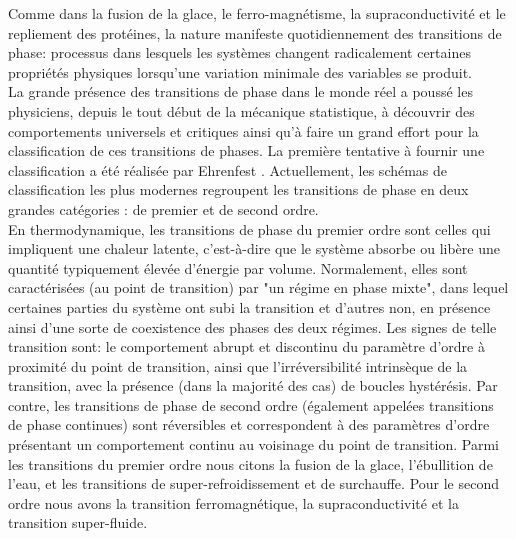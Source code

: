 Comme dans la fusion de la glace, le ferro-magnétisme, la supraconductivité et le repliement des protéines, la nature manifeste quotidiennement des transitions de phase: processus dans lesquels les systèmes changent radicalement certaines propriétés physiques lorsqu'une variation minimale des variables se produit.\\
La grande présence des transitions de phase dans le monde réel a poussé les physiciens, depuis le tout début de la mécanique statistique, à découvrir des comportements universels et critiques ainsi qu'à faire un grand effort pour la classification de ces transitions de phases. La première tentative à fournir une classification a été réalisée par Ehrenfest \cite{Ehrenfest1933}.  Actuellement, les schémas de classification les plus modernes regroupent les transitions de phase en deux grandes catégories : de premier et de second ordre.\\
En thermodynamique, les transitions de phase du premier ordre sont celles qui impliquent une chaleur latente, c'est-à-dire que le système absorbe ou libère une quantité typiquement élevée d'énergie par volume. Normalement, elles sont caractérisées (au point de transition) par "un régime en phase mixte", dans lequel certaines parties du système ont subi la transition et d'autres non, en présence ainsi d'une sorte de coexistence des phases des deux régimes. Les signes de telle transition sont: le comportement abrupt et discontinu du paramètre d'ordre à proximité du point de transition, ainsi que l'irréversibilité intrinsèque de la transition, avec la présence (dans la majorité des cas) de boucles hystérésis. Par contre, les transitions de phase de second ordre (également appelées transitions de phase continues) sont réversibles et correspondent à des paramètres d'ordre présentant un comportement continu au voisinage du point de transition.
Parmi les transitions du premier ordre nous citons la fusion de la glace, l'ébullition de l'eau, et les transitions de super-refroidissement et de surchauffe. Pour le second ordre nous avons la transition ferromagnétique, la supraconductivité et la transition super-fluide.
